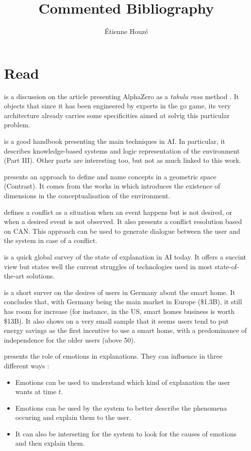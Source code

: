 \documentclass{article}
\title{Commented Bibliography}
\author{\'Etienne Houzé}
\date{}
\begin{document}
\maketitle
    \section{Read}

    \cite{marcus2018innateness} is a discussion on the article presenting AlphaZero as a \emph{tabula rasa} method \cite{silver2017mastering}. It objects that since it has been engineered by experts in the go game, its very architecture already carries some specificities aimed at solvig this particular problem.

    \cite{russell2016artificial} is a good handbook presenting the main techniques in AI. In particular, it describes knowledge-based systems and logic representation of the environment (Part III). Other parts are interesting too, but not as much linked to this work.

    \cite{dessalles2015conceptual}  presents an approach to define and name concepts in a geometric space (Contrast). It comes from the works in \cite{gardenfors2004conceptual} which introduces the existence of dimensions in the conceptualisation of the environment.

    \cite{dessalles2008computational} defines a conflict as a situation when an event happens but is not desired, or when a desired event is not observed. It also presents a conflict resolution based on CAN. This approach can be used to generate dialogue between the user and the system in case of a conflict.

    \cite{dovsilovic2018explainable} is a quick global survey of the state of explanation in AI today. It offers a succint view but states well the current struggles of technologies used in most state-of-the-art solutions.

    \cite{zimmermann2017user} is a short surver on the desires of users in Germany about the smart home. It concludes that, with Germany being the main market in Europe (\$1.3B), it still has room for increase (for instance, in the US, smart homes business is worth \$13B). It also shows on a very small sample that it seems users tend to put energy savings as the first incentive to use a smart home, with a predominance of independence for the older users (above 50).

    \cite{kaptein2017emotion} presents the role of emotions in explanations. They can influence in three different ways :
    \begin{itemize}
        \item Emotions can be used to understand which kind of explanation the user wants at time $t$.
        \item Emotions can be used by the system to better describe the phenomena occuring and explain them to the user.
        \item It can also be interseting for the system to look for the causes of emotions and then explain them.
    \end{itemize}
    
\end{document}

